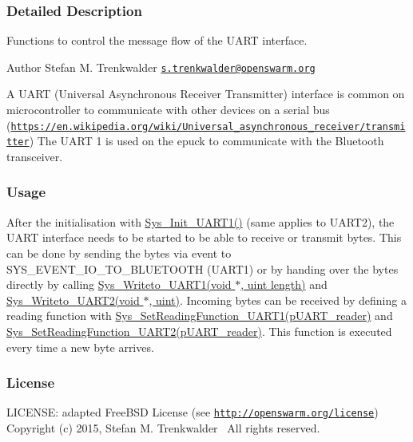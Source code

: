 \subsubsection{Detailed Description}
Functions to control the message flow of the U\+A\+R\+T interface. 

\begin{DoxyAuthor}{Author}
Stefan M. Trenkwalder \href{mailto:s.trenkwalder@openswarm.org}{\tt s.\+trenkwalder@openswarm.\+org}
\end{DoxyAuthor}
A U\+A\+R\+T (Universal Asynchronous Receiver Transmitter) interface is common on microcontroller to communicate with other devices on a serial bus (\href{https://en.wikipedia.org/wiki/Universal_asynchronous_receiver/transmitter}{\tt https\+://en.\+wikipedia.\+org/wiki/\+Universal\+\_\+asynchronous\+\_\+receiver/transmitter}) The U\+A\+R\+T 1 is used on the epuck to communicate with the Bluetooth transceiver.\hypertarget{group__uart_uart_usage}{}\subsubsection{Usage}\label{group__uart_uart_usage}
After the initialisation with \hyperlink{uart_8h_a64689486ee92e3dcd519778bc7afd3de}{Sys\+\_\+\+Init\+\_\+\+U\+A\+R\+T1()} (same applies to U\+A\+R\+T2), the U\+A\+R\+T interface needs to be started to be able to receive or transmit bytes. This can be done by sending the bytes via event to S\+Y\+S\+\_\+\+E\+V\+E\+N\+T\+\_\+\+I\+O\+\_\+\+T\+O\+\_\+\+B\+L\+U\+E\+T\+O\+O\+T\+H (U\+A\+R\+T1) or by handing over the bytes directly by calling \hyperlink{uart_8h_a8528d7cc7f24e0051d8f7697605d9c8f}{Sys\+\_\+\+Writeto\+\_\+\+U\+A\+R\+T1(void $\ast$, uint length)} and \hyperlink{uart_8h_a40e935da5e650eeaa7a15feddd65322a}{Sys\+\_\+\+Writeto\+\_\+\+U\+A\+R\+T2(void $\ast$, uint)}. Incoming bytes can be received by defining a reading function with \hyperlink{uart_8h_a09b6e9f0a90b382e5bb453035ca337af}{Sys\+\_\+\+Set\+Reading\+Function\+\_\+\+U\+A\+R\+T1(p\+U\+A\+R\+T\+\_\+reader)} and \hyperlink{uart_8h_a9fad382ce87c7296fe5ba2005d0a7b10}{Sys\+\_\+\+Set\+Reading\+Function\+\_\+\+U\+A\+R\+T2(p\+U\+A\+R\+T\+\_\+reader)}. This function is executed every time a new byte arrives.\hypertarget{group__uart_uart_license}{}\subsubsection{License}\label{group__uart_uart_license}
L\+I\+C\+E\+N\+S\+E\+: adapted Free\+B\+S\+D License (see \href{http://openswarm.org/license}{\tt http\+://openswarm.\+org/license})~\newline
Copyright (c) 2015, Stefan M. Trenkwalder~\newline
All rights reserved. 
